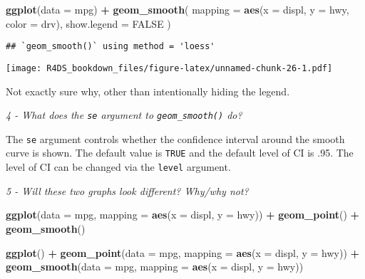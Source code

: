 \documentclass[]{article}
\newenvironment{Shaded}{\begin{snugshade}}{\end{snugshade}}
\newcommand{\KeywordTok}[1]{\textcolor[rgb]{0.13,0.29,0.53}{\textbf{#1}}}
\newcommand{\DataTypeTok}[1]{\textcolor[rgb]{0.13,0.29,0.53}{#1}}
\newcommand{\StringTok}[1]{\textcolor[rgb]{0.31,0.60,0.02}{#1}}
\newcommand{\OtherTok}[1]{\textcolor[rgb]{0.56,0.35,0.01}{#1}}
\newcommand{\OperatorTok}[1]{\textcolor[rgb]{0.81,0.36,0.00}{\textbf{#1}}}
\newcommand{\NormalTok}[1]{#1}
\theoremstyle{definition}
\theoremstyle{definition}
\theoremstyle{definition}
\theoremstyle{remark}
\begin{document}
\begin{Shaded}
\begin{Highlighting}[]
\KeywordTok{ggplot}\NormalTok{(}\DataTypeTok{data =}\NormalTok{ mpg) }\OperatorTok{+}
\StringTok{  }\KeywordTok{geom_smooth}\NormalTok{(}
    \DataTypeTok{mapping =} \KeywordTok{aes}\NormalTok{(}\DataTypeTok{x =}\NormalTok{ displ, }\DataTypeTok{y =}\NormalTok{ hwy, }\DataTypeTok{color =}\NormalTok{ drv),}
    \DataTypeTok{show.legend =} \OtherTok{FALSE}
\NormalTok{  )}
\end{Highlighting}
\end{Shaded}

\begin{verbatim}
## `geom_smooth()` using method = 'loess'
\end{verbatim}

\texttt{[image: R4DS\_bookdown\_files/figure-latex/unnamed-chunk-26-1.pdf]}

Not exactly sure why, other than intentionally hiding the legend.

\emph{4 - What does the \texttt{se} argument to \texttt{geom\_smooth()}
do?}

The \texttt{se} argument controls whether the confidence interval around
the smooth curve is shown. The default value is \texttt{TRUE} and the
default level of CI is .95. The level of CI can be changed via the
\texttt{level} argument.

\emph{5 - Will these two graphs look different? Why/why not?}

\begin{Shaded}
\begin{Highlighting}[]
\KeywordTok{ggplot}\NormalTok{(}\DataTypeTok{data =}\NormalTok{ mpg, }\DataTypeTok{mapping =} \KeywordTok{aes}\NormalTok{(}\DataTypeTok{x =}\NormalTok{ displ, }\DataTypeTok{y =}\NormalTok{ hwy)) }\OperatorTok{+}\StringTok{ }
\StringTok{  }\KeywordTok{geom_point}\NormalTok{() }\OperatorTok{+}\StringTok{ }
\StringTok{  }\KeywordTok{geom_smooth}\NormalTok{()}

\KeywordTok{ggplot}\NormalTok{() }\OperatorTok{+}\StringTok{ }
\StringTok{  }\KeywordTok{geom_point}\NormalTok{(}\DataTypeTok{data =}\NormalTok{ mpg, }\DataTypeTok{mapping =} \KeywordTok{aes}\NormalTok{(}\DataTypeTok{x =}\NormalTok{ displ, }\DataTypeTok{y =}\NormalTok{ hwy)) }\OperatorTok{+}\StringTok{ }
\StringTok{  }\KeywordTok{geom_smooth}\NormalTok{(}\DataTypeTok{data =}\NormalTok{ mpg, }\DataTypeTok{mapping =} \KeywordTok{aes}\NormalTok{(}\DataTypeTok{x =}\NormalTok{ displ, }\DataTypeTok{y =}\NormalTok{ hwy))}
\end{Highlighting}
\end{Shaded}
\end{document}
